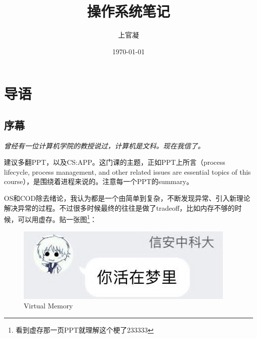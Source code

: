 \documentclass[]{report}
\title{操作系统笔记}
\author{上官凝}
\date{\today}
\begin{document}
\theoremstyle{definition} \newtheorem{theorem}{Thm}[section] %
\theoremstyle{definition} \newtheorem{definition}{Def}[section] %
\theoremstyle{plain} \newtheorem{lemma}{lemma}[section] %

	\maketitle
	\newpage

	\tableofcontents
	\newpage

	\chapter{导语}
	\section{序幕}
	\textit{曾经有一位计算机学院的教授说过，计算机是文科。现在我信了。}\par
	建议多翻PPT，以及CS:APP。这门课的主题，正如PPT上所言（process lifecycle, process management, and other related issues are essential topics of this course），是围绕着进程来说的。注意每一个PPT的summary。\par
	OS和COD除去绪论，我认为都是一个由简单到复杂，不断发现异常、引入新理论解决异常的过程。不过很多时候最终的往往是做了tradeoff，比如内存不够的时候，可以用虚存。贴一张图\footnote{看到虚存那一页PPT就理解这个梗了233333}：\par
	\begin{figure}[h]
		\centering
		\includegraphics[scale = 0.3]{images/Dream_World.jpg}
		\caption{Virtual Memory}
	\end{figure}
\end{document}
